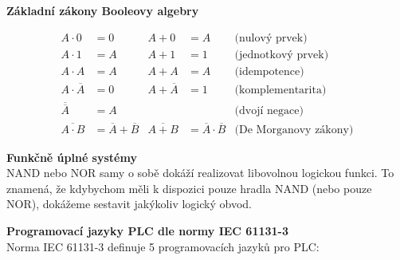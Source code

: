 \documentclass[a4paper,10pt]{article}
\begin{document}
\begin{vysvetlenibox}
\textbf{Základní zákony Booleovy algebry}

\begin{vzorcebox}
\begin{align*}
A \cdot 0 &= 0 & A + 0 &= A & \text{(nulový prvek)} \\
A \cdot 1 &= A & A + 1 &= 1 & \text{(jednotkový prvek)} \\
A \cdot A &= A & A + A &= A & \text{(idempotence)} \\
A \cdot \overline{A} &= 0 & A + \overline{A} &= 1 & \text{(komplementarita)} \\
\overline{\overline{A}} &= A & & & \text{(dvojí negace)} \\
\overline{A \cdot B} &= \overline{A} + \overline{B} &
\overline{A + B} &= \overline{A} \cdot \overline{B} & \text{(De Morganovy zákony)}
\end{align*}
\end{vzorcebox}

\textbf{Funkčně úplné systémy}\\
NAND nebo NOR samy o sobě dokáží realizovat libovolnou logickou funkci.
To znamená, že kdybychom měli k dispozici pouze hradla NAND (nebo pouze NOR),
dokážeme sestavit jakýkoliv logický obvod.

\begin{center}
\end{center}

\textbf{Programovací jazyky PLC dle normy IEC 61131-3}\\
Norma IEC 61131-3 definuje 5 programovacích jazyků pro PLC:


\end{vysvetlenibox}
\end{document}
